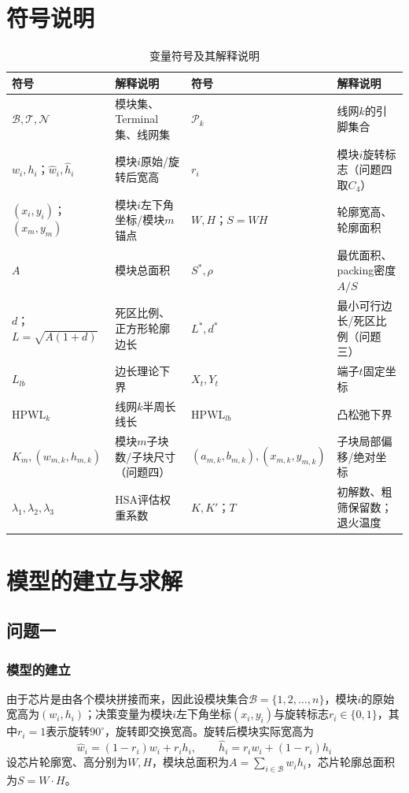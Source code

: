 \documentclass{JXUSTmodeling}
\begin{document}
\section{符号说明}\label{sec:4}
\begin{table}[H]
	\centering 
	\small
	\caption{\label{tab:symbol}变量符号及其解释说明}
	\begin{tabularx}{\textwidth}{@{}lXlX@{}}
		\toprule[2pt]
		符号 & 解释说明 & 符号 & 解释说明 \\
		\midrule
		$\mathcal{B},\mathcal{T},\mathcal{N}$ & 模块集、Terminal集、线网集 & $\mathcal{P}_k$ & 线网$k$的引脚集合 \\
		$w_i,h_i$；$\hat w_i,\hat h_i$ & 模块$i$原始/旋转后宽高 & $r_i$ & 模块$i$旋转标志（问题四取$C_4$） \\
		$(x_i,y_i)$；$(x_m,y_m)$ & 模块$i$左下角坐标/模块$m$锚点 & $W,H$；$S=WH$ & 轮廓宽高、轮廓面积 \\
		$A$ & 模块总面积 & $S^{\ast},\rho$ & 最优面积、packing密度$A/S$ \\
		$d$；$L=\sqrt{A(1+d)}$ & 死区比例、正方形轮廓边长 & $L^{\ast},d^{\ast}$ & 最小可行边长/死区比例（问题三） \\
		$L_{lb}$ & 边长理论下界 & $X_t,Y_t$ & 端子$t$固定坐标 \\
		$\mathrm{HPWL}_k$ & 线网$k$半周长线长 & $\mathrm{HPWL}_{lb}$ & 凸松弛下界 \\
		$K_m,(w_{m,k},h_{m,k})$ & 模块$m$子块数/子块尺寸（问题四） & $(a_{m,k},b_{m,k}),(x_{m,k},y_{m,k})$ & 子块局部偏移/绝对坐标 \\
		$\lambda_1,\lambda_2,\lambda_3$ & HSA评估权重系数 & $K,K'$；$T$ & 初解数、粗筛保留数；退火温度 \\
		\bottomrule[2pt]
	\end{tabularx}
\end{table}
\section{模型的建立与求解}\label{sec:5}
\subsection{问题一}\label{sub:5.1}
\subsubsection{模型的建立}
由于芯片是由各个模块拼接而来，因此设模块集合$\mathcal{B}=\{1,2,\ldots,n\}$，模块$i$的原始宽高为$(w_i,h_i)$；决策变量为模块$i$左下角坐标$(x_i,y_i)$与旋转标志$r_i\in\{0,1\}$，其中$r_i=1$表示旋转$90^{\circ}$，旋转即交换宽高。旋转后模块实际宽高为
\begin{equation}
\hat{w}_i=(1-r_i)w_i+r_i h_i,\qquad \hat{h}_i=r_i w_i+(1-r_i)h_i
\label{eq:p1_rot}
\end{equation}
设芯片轮廓宽、高分别为$W,H$，模块总面积为$A=\sum_{i\in\mathcal{B}}w_i h_i$，芯片轮廓总面积为$S=W\cdot H$。
\end{document}
